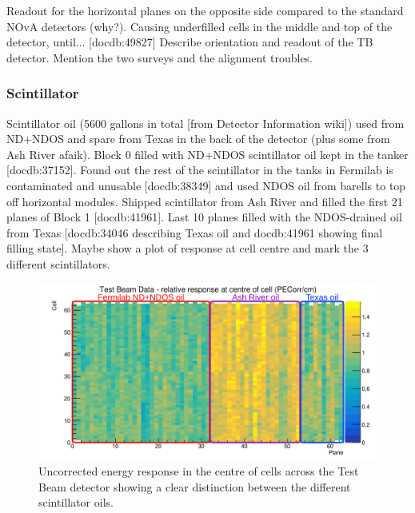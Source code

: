 \documentclass[12pt,a4paper]{article}
\begin{document}
Readout for the horizontal planes on the opposite side compared to the standard NOvA detectors (why?). Causing underfilled cells in the middle and top of the detector, until... [docdb:49827]
Describe orientation and readout of the TB detector.
Mention the two surveys and the alignment troubles.

\subsubsection*{Scintillator}
Scintillator oil (5600 gallons in total [from Detector Information wiki]) used from ND+NDOS and spare from Texas in the back of the detector (plus some from Ash River afaik).
Block 0 filled with ND+NDOS scintillator oil kept in the tanker [docdb:37152]. Found out the rest of the scintillator in the tanks in Fermilab is contaminated and unusable [docdb:38349] and used NDOS oil from barells to top off horizontal modules.
Shipped scintillator from Ash River and filled the first 21 planes of Block 1 [docdb:41961]. Last 10 planes filled with the NDOS-drained oil from Texas [docdb:34046 describing Texas oil and docdb:41961 showing final filling state].
Maybe show a plot of response at cell centre and mark the 3 different scintillators.

\begin{figure}[hbtp]
\centering
\includegraphics[width=\textwidth]{Plots/TestBeamScintillatorOils.png}
\caption{Uncorrected energy response in the centre of cells across the Test Beam detector showing a clear distinction between the different scintillator oils.}
\end{figure}
\end{document}
